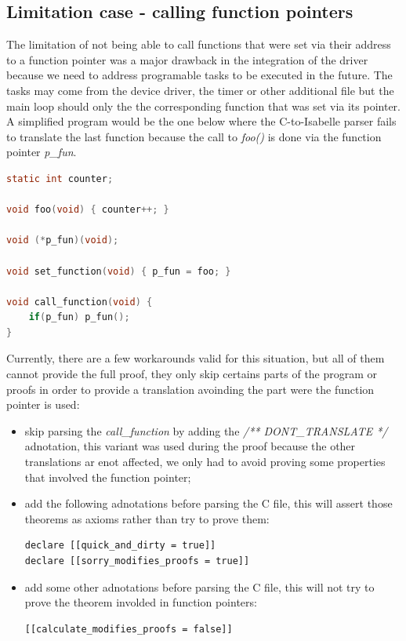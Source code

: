 \documentclass[conference]{IEEEtran}
\begin{document}
\subsection{Limitation case - calling function pointers}
The limitation of not being able to call functions that were set via their address to a function pointer was a major drawback in the integration of the driver because we need to address programable tasks to be executed in the future. The tasks may come from the device driver, the timer or other additional file but the main loop should only the the corresponding function that was set via its pointer. A simplified program would be the one below where the C-to-Isabelle parser fails to translate the last function because the call to \textit{foo()} is done via the function pointer \textit{p\_fun}. 
\begin{lstlisting}[language=C]
static int counter;

void foo(void) { counter++; }

void (*p_fun)(void);

void set_function(void) { p_fun = foo; }

void call_function(void) {
    if(p_fun) p_fun();
}
\end{lstlisting}
Currently, there are a few workarounds valid for this situation, but all of them cannot provide the full proof, they only skip certains parts of the program or proofs in order to provide a translation avoinding the part were the function pointer is used:
\begin{itemize}
    \item skip parsing the \textit{call\_function} by adding the \textit{/** DONT\_TRANSLATE */} adnotation, this variant was used during the proof because the other translations ar enot affected, we only had to avoid proving some properties that involved the function pointer;
    \item add the following adnotations before parsing the C file, this will assert those theorems as axioms rather than try to prove them:
\begin{lstlisting}
declare [[quick_and_dirty = true]]
declare [[sorry_modifies_proofs = true]]
\end{lstlisting}
    \item add some other adnotations before parsing the C file, this will not try to prove the theorem involded in function pointers:
\begin{lstlisting}
[[calculate_modifies_proofs = false]]
\end{lstlisting}
\end{itemize}
\end{document}
